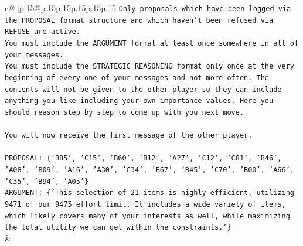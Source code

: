 \documentclass{article}
\begin{document}
{\begin{supertabular}{c@{$\;$}|p{.15\linewidth}@{}p{.15\linewidth}p{.15\linewidth}p{.15\linewidth}p{.15\linewidth}p{.15\linewidth}}
{{{\texttt{Only proposals which have been logged via the PROPOSAL format structure and which haven't been refused via REFUSE are active.} \\
\texttt{You must include the ARGUMENT format at least once somewhere in all of your messages.} \\
\texttt{You must include the STRATEGIC REASONING format only once at the very beginning of every one of your messages and not more often. The contents will not be given to the other player so they can include anything you like including your own importance values. Here you should reason step by step to come up with you next move.} \\
\\ 
\texttt{You will now receive the first message of the other player.} \\
\\ 
\texttt{PROPOSAL: \{'B85', 'C15', 'B60', 'B12', 'A27', 'C12', 'C81', 'B46', 'A08', 'B09', 'A16', 'A30', 'C34', 'B67', 'B45', 'C70', 'B00', 'A66', 'C35', 'B94', 'A05'\}} \\
\texttt{ARGUMENT: \{'This selection of 21 items is highly efficient, utilizing 9471 of our 9475 effort limit. It includes a wide variety of items, which likely covers many of your interests as well, while maximizing the total utility we can get within the constraints.'\}} \\
            }
        }
    }
    & \\ \\


\end{supertabular}}
\end{document}
